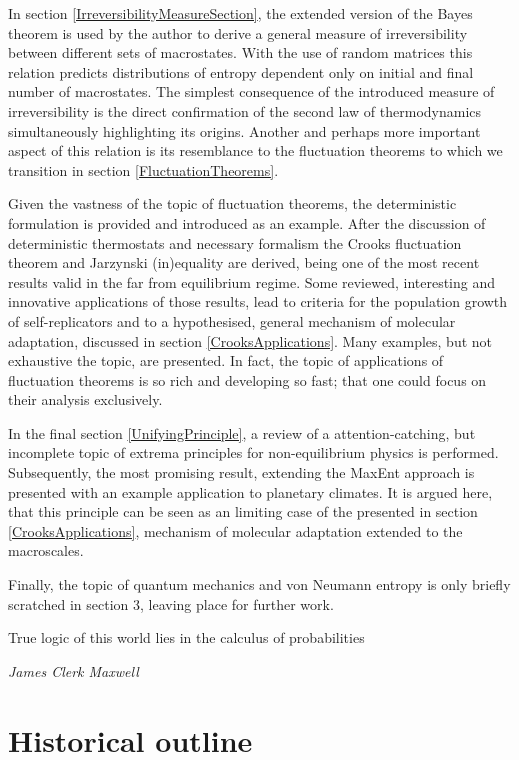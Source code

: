 \documentclass[a4paper,12pt]{article}
\begin{document}
In section \ref{IrreversibilityMeasureSection}, the extended version of the Bayes theorem is used by the author to derive a general measure of irreversibility between different sets of macrostates. With the use of random matrices this relation predicts distributions of entropy dependent only on initial and final number of macrostates. The simplest consequence of the introduced measure of irreversibility is the direct confirmation of the second law of thermodynamics simultaneously highlighting its origins. Another and perhaps more important aspect of this relation is its resemblance to the fluctuation theorems to which we transition in section \ref{FluctuationTheorems}.

Given the vastness of the topic of fluctuation theorems, the deterministic formulation is provided and introduced as an example. After the discussion of deterministic thermostats and necessary formalism the Crooks fluctuation theorem and Jarzynski (in)equality are derived, being one of the most recent results valid in the far from equilibrium regime. Some reviewed, interesting and innovative applications of those results, lead to criteria for the population growth of self-replicators and to a hypothesised, general mechanism of molecular adaptation, discussed in section \ref{CrooksApplications}. Many examples, but not exhaustive the topic, are presented. In fact, the topic of applications of fluctuation theorems is so rich and developing so fast; that one could focus on their analysis exclusively.

In the final section \ref{UnifyingPrinciple}, a review of a attention-catching, but incomplete topic of extrema principles for non-equilibrium physics is performed. Subsequently, the most promising result, extending the MaxEnt approach is presented with an example application to planetary climates.
It is argued here, that this principle can be seen as an limiting case of the presented in section \ref{CrooksApplications}, mechanism of molecular adaptation extended to the macroscales.

Finally, the topic of quantum mechanics and von Neumann entropy is only briefly scratched in section 3, leaving place for further work.


\newpage
\epigraph{True logic of this world lies in the calculus of probabilities}{\textit{James Clerk Maxwell}}
\section{Historical outline}
\end{document}

